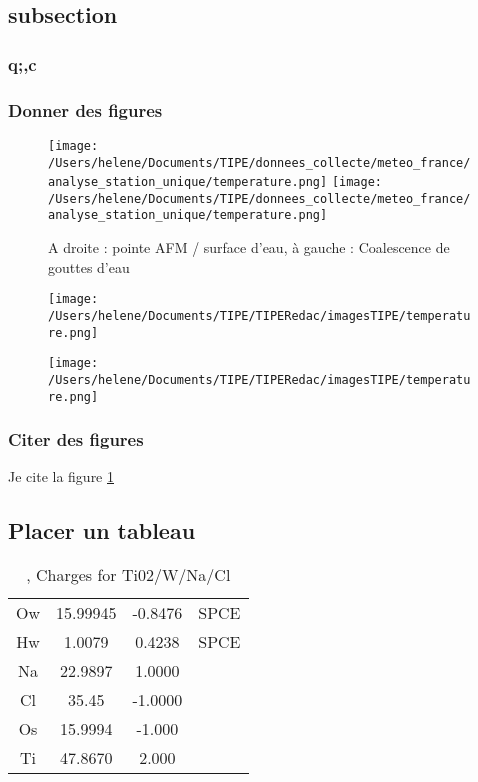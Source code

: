\documentclass[11pt,a4paper]{article}
\begin{document}
{\subsection{subsection}
\subsubsection{q;,c}
\subsubsection{Donner des figures}
\begin{figure}
\centering
\texttt{[image: /Users/helene/Documents/TIPE/donnees\_collecte/meteo\_france/analyse\_station\_unique/temperature.png]}\quad
\texttt{[image: /Users/helene/Documents/TIPE/donnees\_collecte/meteo\_france/analyse\_station\_unique/temperature.png]}
\caption{\label{fig:190101Lolita} A droite : pointe AFM / surface d'eau, à gauche :  Coalescence de gouttes d'eau }
\end{figure}
\begin{figure}
  \texttt{[image: /Users/helene/Documents/TIPE/TIPERedac/imagesTIPE/temperature.png]}\quad
\end{figure}
\begin{figure}
  \texttt{[image: /Users/helene/Documents/TIPE/TIPERedac/imagesTIPE/temperature.png]}\quad
\end{figure}

\subsubsection{Citer des figures}
Je cite la figure \ref{fig:190101Lolita}
\subsection{Placer un tableau}
\begin{table}[ht]
\begin{tabular}{cccc}\hline
\hline
Ow& 15.99945& -0.8476&SPCE\\
Hw&  1.0079 &  0.4238&SPCE\\
Na& 22.9897 &  1.0000&\\         
Cl& 35.45   & -1.0000&\\
Os& 15.9994 & -1.000 &\\   
Ti& 47.8670 &  2.000 &\\  
\hline 
\end{tabular}                     
\caption{\label{MonTableau}, Charges for Ti02/W/Na/Cl}
\end{table}
}
\end{document}
